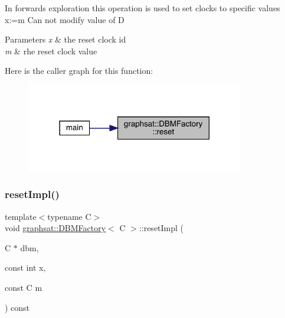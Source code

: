 In forwards exploration this operation is used to set clocks to specific values x\+:=m Can not modify value of D 
\begin{DoxyParams}{Parameters}
{\em x} & the reset clock id \\
\hline
{\em m} & rhe reset clock value \\
\hline
\end{DoxyParams}
Here is the caller graph for this function\+:
\nopagebreak
\begin{figure}[H]
\begin{center}
\leavevmode
\includegraphics[width=270pt]{classgraphsat_1_1_d_b_m_factory_aecc4c6f42165cbce7cc7465e4558846e_icgraph}
\end{center}
\end{figure}
\mbox{\label{classgraphsat_1_1_d_b_m_factory_a2b760cdec73147a8bb44d043b349074b}} 
\subsubsection{\texorpdfstring{resetImpl()}{resetImpl()}}
{\footnotesize\ttfamily template$<$typename C$>$ \\
void \mbox{\hyperlink{classgraphsat_1_1_d_b_m_factory}{graphsat\+::\+D\+B\+M\+Factory}}$<$ C $>$\+::reset\+Impl (\begin{DoxyParamCaption}\item[{C $\ast$}]{dbm,  }\item[{const int}]{x,  }\item[{const C}]{m }\end{DoxyParamCaption}) const\hspace{0.3cm}{\ttfamily [inline]}}

